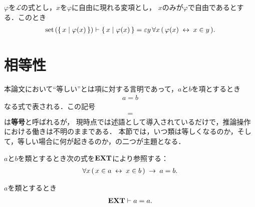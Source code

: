 	\begin{screen}
		\begin{thm}
		\label{thm:if_a_class_is_a_set_then_equal_to_some_epsilon_term}
			$\varphi$を$\mathcal{L}$の式とし，$x$を$\varphi$に自由に現れる変項とし，
			$x$のみが$\varphi$で自由であるとする．このとき
			\begin{align}
				\operatorname*{set}\hspace{0.15em}(\{\, x \mid \varphi(x)\, \}) \vdash \{\, x \mid \varphi(x)\, \} 
				= \varepsilon y\, \forall x\, (\, \varphi(x) \hspace{0.25em}\leftrightarrow\hspace{0.25em} x \in y\, ).
			\end{align}
		\end{thm}
	\end{screen}
	
\section{相等性}
	本論文において``等しい''とは項に対する言明であって，$a$と$b$を項とするとき
	\begin{align}
		a = b
	\end{align}
	なる式で表される．この記号
	\begin{align}
		=
	\end{align}
	は{\bf 等号}と呼ばれるが，
	現時点では述語として導入されているだけで，推論操作における働きは不明のままである．
	本節では，いつ類は等しくなるのか，そして，等しい場合に何が起きるのか，の二つが主題となる．
	
	\begin{screen}
		\begin{axm}
			$a$と$b$を類とするとき次の式を$\mbox{{\bf EXT}}$により参照する：
			\begin{align}
				\forall x\, (\, x \in a \hspace{0.25em}\leftrightarrow\hspace{0.25em} x \in b\, ) \hspace{0.25em}\rightarrow\hspace{0.25em} a=b.
			\end{align}
		\end{axm}
	\end{screen}
	
	\begin{screen}
		\begin{thm}[任意の類は自分自身と等しい]\label{thm:any_class_equals_to_itself}
			$a$を類とするとき
			\begin{align}
				\mbox{{\bf EXT}} \vdash a = a.
			\end{align}
		\end{thm}
	\end{screen}
	
